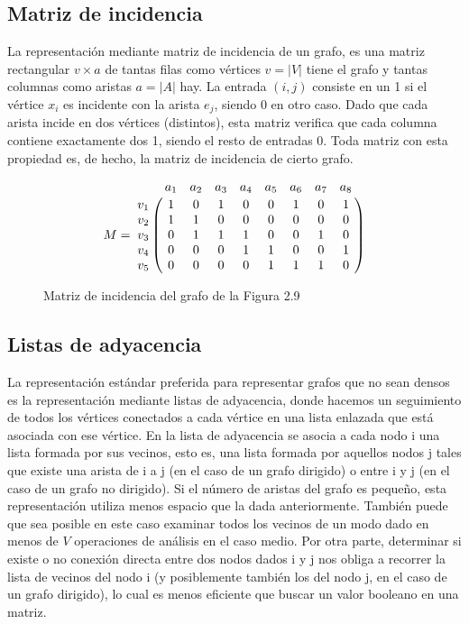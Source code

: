 \subsection{Matriz de incidencia}

La representación mediante matriz de incidencia de un grafo, es una matriz rectangular $v \times a$ de tantas filas como vértices $v = |V|$ tiene el grafo y tantas columnas como aristas $a = |A|$ hay. La entrada $(i,j)$ consiste en un 1 si el vértice $x_i$ es incidente con la arista $e_j$, siendo 0 en otro caso. Dado que cada arista incide en dos vértices (distintos), esta matriz verifica que cada columna contiene exactamente dos 1, siendo el resto de entradas 0. Toda matriz con esta propiedad es, de hecho, la matriz de incidencia de cierto grafo.

\begin{center}
\[
M = \bordermatrix{~ & a_1 & a_2 & a_3 & a_4 & a_5 & a_6 & a_7 & a_8 \cr
                  v_1 & 1 & 0 & 1 & 0 & 0 & 1 & 0 & 1 \cr
                  v_2 & 1 & 1 & 0 & 0 & 0 & 0 & 0 & 0 \cr
                  v_3 & 0 & 1 & 1 & 1 & 0 & 0 & 1 & 0 \cr
                  v_4 & 0 & 0 & 0 & 1 & 1 & 0 & 0 & 1 \cr
                  v_5 & 0 & 0 & 0 & 0 & 1 & 1 & 1 & 0 \cr}
\]
\end{center}
\begin{figure}[H]
\begin{center}
\caption{Matriz de incidencia del grafo de la Figura 2.9}
\end{center}
\end{figure}


\subsection{Listas de adyacencia}

La representación estándar preferida para representar grafos que no sean densos es la representación mediante listas de adyacencia, donde hacemos un seguimiento de todos los vértices conectados a cada vértice en una lista enlazada que está asociada con ese vértice. En la lista de adyacencia se asocia a cada nodo i una lista formada por sus vecinos, esto es, una lista formada por aquellos nodos j tales que existe una arista de i a j (en el caso de un grafo dirigido) o entre i y j (en el caso de un grafo no dirigido). Si el número de aristas del grafo es pequeño, esta representación utiliza menos espacio que la dada anteriormente. También puede que sea posible en este caso examinar todos los vecinos de un modo dado en menos de $V$ operaciones de análisis en el caso medio. Por otra parte, determinar si existe o no conexión directa entre dos nodos dados i y j nos obliga a recorrer la lista de vecinos del nodo i (y posiblemente también los del nodo j, en el caso de un grafo dirigido), lo cual es menos eficiente que buscar un valor booleano en una matriz.\\

